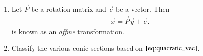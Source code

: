 \begin{enumerate}[label=\arabic*.,ref=\thesubsection.\theenumi]
\item Let $\vec{P}$ be a rotation matrix and  $\vec{c}$ be a vector. Then 
\begin{align}
\vec{x} = \vec{P}\vec{y}+\vec{c}.
\label{eq:affine}
\end{align}
 is known as an {\em affine} transformation.
\item Classify the various conic sections based on $\eqref{eq:quadratic_vec}$.
\\
\solution 
\begin{table}[!ht]
\begin{center}

\end{center}
\caption{}
\label{table:conics}
\end{table}

\end{enumerate}
